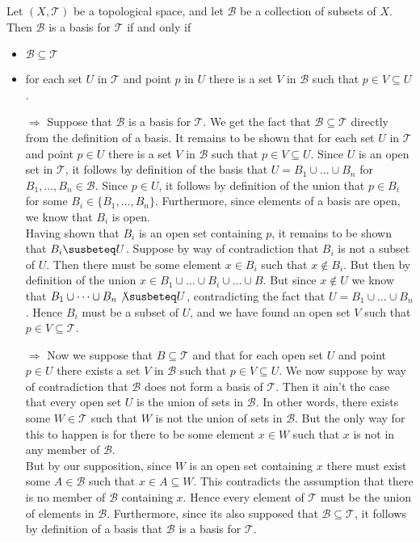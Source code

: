 \documentclass{article}
\newcommand{\topT}{\mathcal{T}}
\begin{document}
\newpage


 Let $(X,\topT)$ be a topological space, and let $\mathcal{B}$ be a collection of subsets of $X$. Then $\mathcal{B}$ is a basis for $\topT$ if and only if
\begin{itemize}
    \item $\mathcal{B}\subseteq \topT$
    \item for each set $U$ in $\topT$ and point $p$ in $U$ there is a set $V$ in $\mathcal{B}$ such that $p\in V\subseteq U$. 
\end{itemize}

\begin{itemize}
    \item[$\Rightarrow$] Suppose that $\mathcal{B}$ is a basis for $\topT$. We get the fact that $\mathcal{B}\subseteq \topT$ directly from the definition of a basis. It remains to be shown that for each set $U$ in $\topT$ and point $p\in U$ there is a set $V$ in $\mathcal{B}$ such that $p\in V\subseteq U$. Since $U$ is an open set in $\topT$, it follows by definition of the basis that $U = B_1\cup ...\cup B_n$ for $B_1,\dots,B_n\in \mathcal{B}$. Since $p\in U$, it follows by definition of the union that $p\in B_i$ for some $B_i\in \{B_1,\dots,B_n\}$. Furthermore, since elements of a basis are open, we know that $B_i$ is open. \\
    
    Having shown that $B_i$ is an open set containing $p$, it remains to be shown that $B_i\susbeteq U$. Suppose by way of contradiction that $B_i$ is not a subset of $U$. Then there must be some element $x\in B_i$ such that $x\not \in B_i$. But then by definition of the union $x\in B_1\cup\dots\cup B_i\cup \dots\cup B$. But since $x\not \in U$ we know that $B_1\cup \dots\cup B_n \not\susbeteq U$, contradicting the fact that $U = B_1\cup \dots\cup B_n$. Hence $B_i$ must be a subset of $U$, and we have found an open set $V$ such that $p\in V \subseteq \topT$.
    
    \item[$\Rightarrow$] Now we suppose that $B\subseteq \topT$ and that for each open set $U$ and point $p\in U$ there exists a set $V$ in $\mathcal{B}$ such that $p\in V\subseteq U$. We now suppose by way of contradiction that $\mathcal{B}$ does not form a basis of $\topT$. Then it ain't the case that every open set $U$ is the union of sets in $\mathcal{B}$. In other words, there exists some $W\in \topT$ such that $W$ is not the union of sets in $\mathcal{B}$. But the only way for this to happen is for there to be some element $x\in W$ such that $x$ is not in any member of $\mathcal{B}$.\\
    
    But by our supposition, since $W$ is an open set containing $x$ there must exist some $A\in \mathcal{B}$ such that $x\in A\subseteq W$. This contradicts the assumption that there is no member of $\mathcal{B}$ containing $x$. Hence every element of $\topT$ must be the union of elements in $\mathcal{B}$. Furthermore, since its also supposed that $\mathcal{B}\subseteq \topT$, it follows by definition of a basis that $\mathcal{B}$ is a basis for $\topT$.
    
    
    
\end{itemize}
\end{document}
